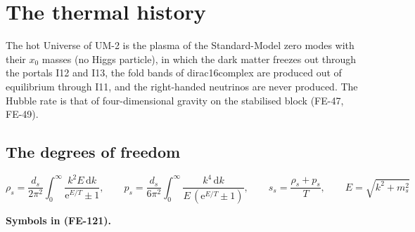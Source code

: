 \documentclass[
  10pt,
]{article}
\begin{document}
\hypertarget{the-thermal-history}{%
\section{The thermal history}\label{the-thermal-history}}

The hot Universe of UM-2 is the plasma of the Standard-Model zero modes
with their \(x_0\) masses (no Higgs particle), in which the dark matter
freezes out through the portals I12 and I13, the fold bands of
dirac16complex are produced out of equilibrium through I11, and the
right-handed neutrinos are never produced. The Hubble rate is that of
four-dimensional gravity on the stabilised block (FE-47, FE-49).

\hypertarget{the-degrees-of-freedom}{%
\subsection{The degrees of freedom}\label{the-degrees-of-freedom}}

\[
\rho_s = \frac{d_s}{2\pi^2}\int_0^\infty\frac{k^2E\,\mathrm{d}k}{\mathrm{e}^{E/T} \pm 1},\qquad
p_s = \frac{d_s}{6\pi^2}\int_0^\infty\frac{k^4\,\mathrm{d}k}{E\,(\mathrm{e}^{E/T} \pm 1)},\qquad
s_s = \frac{\rho_s + p_s}{T},\qquad E = \sqrt{k^2 + m_s^2} \tag{FE-121}
\]

\textbf{Symbols in (FE-121).}
\end{document}
